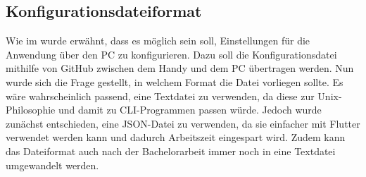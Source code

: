 \subsection{Konfigurationsdateiformat}\label{section:tech:sub:konfigurationsdateiformat}%
Wie im  wurde erwähnt, dass es möglich sein soll, Einstellungen für die Anwendung über den PC zu konfigurieren. Dazu soll die Konfigurationsdatei mithilfe von GitHub zwischen dem Handy und dem PC übertragen werden.\newline%
Nun wurde sich die Frage gestellt, in welchem Format die Datei vorliegen sollte.\newline%
Es wäre wahrscheinlich passend, eine Textdatei zu verwenden, da diese zur Unix-Philosophie\cite{tech_unix-philosophie} und damit zu CLI-Programmen passen würde. %
Jedoch wurde zunächst entschieden, eine JSON-Datei zu verwenden, da sie einfacher mit Flutter verwendet werden kann und dadurch Arbeitszeit eingespart wird. %
Zudem kann das Dateiformat auch nach der Bachelorarbeit immer noch in eine Textdatei umgewandelt werden.%